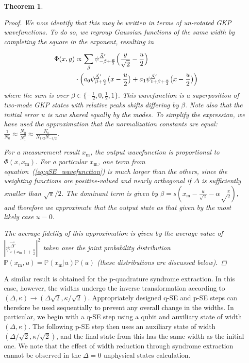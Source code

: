 \documentclass[prx,reprint,superscriptaddress,longbibliography,floatfix,nofootinbib]{revtex4-1}
\newtheorem{theorem}{Theorem}
\begin{document}
\begin{theorem}
\begin{proof}
We now identify that this may be written in terms of un-rotated GKP wavefunctions. To do so, we regroup Gaussian functions of the same width by completing the square in the exponent, resulting in 

\begin{equation}\label{eq:qSE_wavefunction}
\begin{split}
\Phi(x,y) & \propto \sum_{\beta} \psi_{-\beta+\frac{\alpha}{2}}^{\vec{\Delta}'} \Big{(}\frac{y}{\sqrt{2}}-\frac{u}{2}\Big{)} \\
&\cdot \Big{(}a_0 \psi_{\beta+\frac{\alpha}{2}}^{\vec{\Delta}'} \big(x-\frac{u}{2}\big) + a_1 \psi_{1+\beta+\frac{\alpha}{2}}^{\vec{\Delta}'} \big(x-\frac{u}{2}\big)\Big{)}
\end{split}
\end{equation}
where the sum is over $\beta\in\{-\frac{1}{2},0,\frac{1}{2},1\}$. This wavefunction is a superposition of two-mode GKP states with relative peaks shifts differing by $\beta$. Note also that the initial error $u$ is now shared equally by the modes. To simplify the expression, we have used the approximation that the normalization constants are equal: $\frac{1}{N_0} \approx \frac{N_0}{N_1^2} \approx \frac{N_0}{N_{1/2} N_{-1/2}}$.

For a measurement result $x_\mathrm{m}$, the output wavefunction is proportional to $\Phi(x,x_\mathrm{m})$. For a particular $x_\mathrm{m}$, one term from equation~(\ref{eq:qSE_wavefunction}) is much larger than the others, since the weighting functions are positive-valued and nearly orthogonal if $\Delta$ is sufficiently smaller than $\sqrt{\pi}/2$. The dominant term is given by $\beta = s(x_\mathrm{m}-\frac{u}{\sqrt{2}}-\alpha\sqrt\frac{\pi}{2})$, and therefore we approximate that the output state as that given by the most likely case $u=0$. 

The average fidelity of this approximation is given by the average value of $|\psi_{s(x_\mathrm{m})+\frac{\alpha}{2}}^{\vec{\Delta}'}|^2$ taken over the joint probability distribution $\mathbb{P}(x_\mathrm{m},u)=\mathbb{P}(x_\mathrm{m}|u)\mathbb{P}(u)$ (these distributions are discussed below).
\end{proof}
\end{theorem}

A similar result is obtained for the p-quadrature syndrome extraction. In this case, however, the widths undergo the inverse transformation according to $(\Delta,\kappa)\rightarrow (\Delta\sqrt{2},\kappa/\sqrt{2})$. Appropriately designed q-SE and p-SE steps can therefore be used sequentially to prevent any overall change in the widths. In particular, we begin with a q-SE step using a qubit and auxiliary state of width $(\Delta,\kappa)$. The following p-SE step then uses an auxiliary state of width $(\Delta/\sqrt{2},\kappa/\sqrt{2})$, and the final state from this has the same width as the initial one. We note that the effect of width reduction through syndrome extraction cannot be observed in the $\Delta = 0$ unphysical states calculation.  
\end{document}
